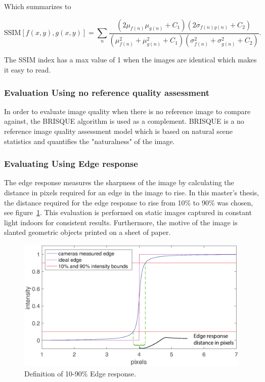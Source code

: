 Which summarizes to

\begin{equation}
\text{SSIM}[f(x,y),g(x,y)] = \sum_n \frac{(2\mu_{f(n)}\mu_{g(n)} + C_1)(2\sigma_{f(n)g(n)} + C_2)}{(\mu_{f(n)}^2 + \mu_{g(n)}^2 + C_1)(\sigma_{f(n)}^2 + \sigma_{g(n)}^2 + C_2)}.
\end{equation} 

The SSIM index has a max value of 1 when the images are identical which makes it easy to read. \cite{book:image_processing}

\subsubsection{Evaluation Using no reference quality assessment}
In order to evaluate image quality when there is no reference image to compare against, the BRISQUE algorithm is used as a complement. BRISQUE is a no reference image quality assessment model which is based on natural scene statistics and quantifies the "naturalness" of the image.    \cite{article:brisque}

\subsubsection{Evaluating Using Edge response}
The edge response measures the sharpness of the image by calculating the distance in pixels required for an edge in the image to rise. In this master's thesis, the distance required for the edge response to rise from 10\% to 90\% was chosen, see figure~\ref{fig:edge_response_def}. This evaluation is performed on static images captured in constant light indoors for consistent results. Furthermore, the motive of the image is slanted geometric objects printed on a sheet of paper.\cite{article:FOI_pres_sens}
 
\begin{figure}[H]
\includegraphics[width = 1\textwidth]{./result/edge_response.eps}
	\caption{Definition of 10-90\% Edge response.}
	\label{fig:edge_response_def}
\end{figure}

